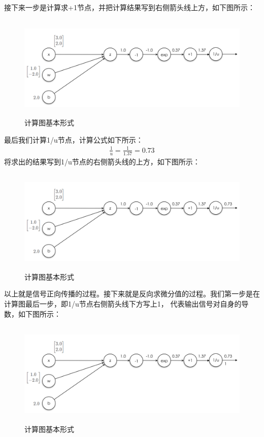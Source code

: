 \documentclass[UTF8]{article}
\begin{document}
接下来一步是计算求+1节点，并把计算结果写到右侧箭头线上方，如下图所示：
\begin{figure}[H]
	\caption{计算图基本形式}
	\label{f000040}
	\centering
	\includegraphics[height=5cm]{images/f000040}
\end{figure}
最后我们计算1/u节点，计算公式如下所示：
\begin{equation}
\begin{aligned}
\frac{1}{u}=\frac{1}{1.37}=0.73
\end{aligned}
\label{mlp-sigmoid-cg-4}
\end{equation}
将求出的结果写到1/u节点的右侧箭头线的上方，如下图所示：
\begin{figure}[H]
	\caption{计算图基本形式}
	\label{f000041}
	\centering
	\includegraphics[height=5cm]{images/f000041}
\end{figure}
以上就是信号正向传播的过程。接下来就是反向求微分值的过程。我们第一步是在计算图最后一步，即1/u节点右侧箭头线下方写上1，
代表输出信号对自身的导数，如下图所示：
\begin{figure}[H]
	\caption{计算图基本形式}
	\label{f000042}
	\centering
	\includegraphics[height=5cm]{images/f000042}
\end{figure}
\end{document}
